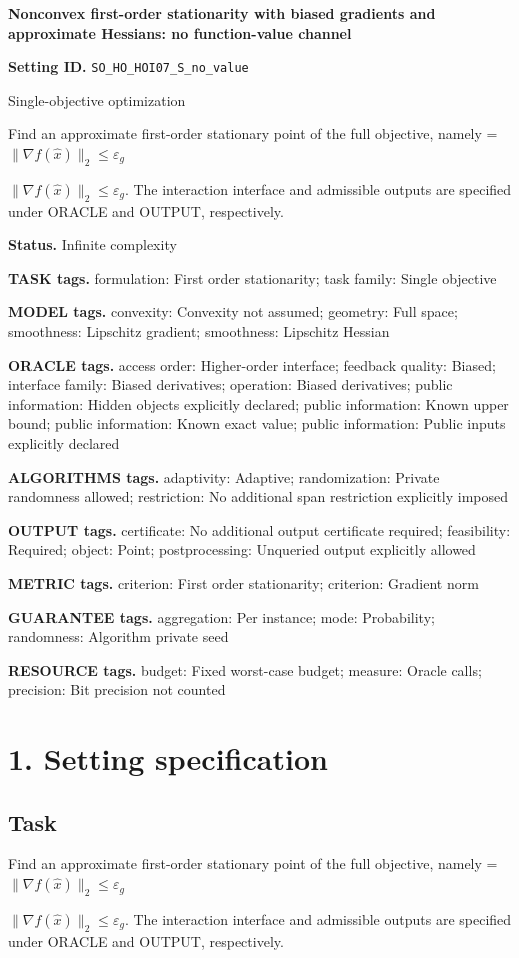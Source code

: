 \documentclass[10pt,a4paper]{article}
\newcommand{\AtlasMath}[1]{\par\begingroup\centering\setbox0=\hbox{$\displaystyle #1$}\ifdim\wd0>1.4\linewidth\typeout{ATLAS WIDE FORMULA: \the\wd0}\fi\ifdim\wd0>\linewidth\resizebox{\linewidth}{!}{\box0}\else\box0\fi\par\endgroup}
\newcommand{\AtlasInlineMath}[1]{\begingroup\setbox0=\hbox{$#1$}\ifdim\wd0>.4\linewidth\endgroup\AtlasMath{#1}\else\endgroup$#1$\fi}
\begin{document}
\raggedright

{\LARGE\bfseries\sffamily\color{AtlasNavy} Nonconvex first-order stationarity with biased gradients and approximate Hessians: no function-value channel\par}\vspace{5pt}
\textbf{Setting ID.} \texttt{SO\_\allowbreak{}HO\_\allowbreak{}HOI07\_\allowbreak{}S\_\allowbreak{}no\_\allowbreak{}value}

Single-objective optimization

Find an approximate first-order stationary point of the full objective, namely \AtlasInlineMath{\|\nabla f(\widehat{x})\|_2\le\varepsilon_g}. The interaction interface and admissible outputs are specified under ORACLE and OUTPUT, respectively.

\textbf{Status.} Infinite complexity

\textbf{TASK tags.} formulation: First order stationarity; task family: Single objective

\textbf{MODEL tags.} convexity: Convexity not assumed; geometry: Full space; smoothness: Lipschitz gradient; smoothness: Lipschitz Hessian

\textbf{ORACLE tags.} access order: Higher-order interface; feedback quality: Biased; interface family: Biased derivatives; operation: Biased derivatives; public information: Hidden objects explicitly declared; public information: Known upper bound; public information: Known exact value; public information: Public inputs explicitly declared

\textbf{ALGORITHMS tags.} adaptivity: Adaptive; randomization: Private randomness allowed; restriction: No additional span restriction explicitly imposed

\textbf{OUTPUT tags.} certificate: No additional output certificate required; feasibility: Required; object: Point; postprocessing: Unqueried output explicitly allowed

\textbf{METRIC tags.} criterion: First order stationarity; criterion: Gradient norm

\textbf{GUARANTEE tags.} aggregation: Per instance; mode: Probability; randomness: Algorithm private seed

\textbf{RESOURCE tags.} budget: Fixed worst-case budget; measure: Oracle calls; precision: Bit precision not counted

\section{1. Setting specification}
\subsection{Task}
Find an approximate first-order stationary point of the full objective, namely \AtlasInlineMath{\|\nabla f(\widehat{x})\|_2\le\varepsilon_g}. The interaction interface and admissible outputs are specified under ORACLE and OUTPUT, respectively.
\end{document}
